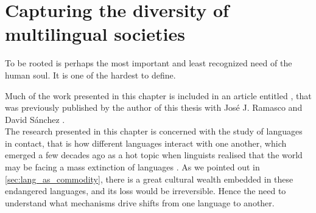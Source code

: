 \documentclass[../thesis.tex]{subfiles}
\begin{document}
\chapter{Capturing the diversity of multilingual societies}
\label{ch:multiling}

\epigraph{
  To be rooted is perhaps the most important and least recognized need of the
  human soul. It is one of the hardest to define.
}{
}

Much of the work presented in this chapter is included in an article entitled
, that was previously published by the author of
this thesis with Jos\'{e} J. Ramasco and David S\'{a}nchez
\cite{LoufCapturingDiversity2021}.
\\

The research presented in this chapter is concerned with the study of languages in
contact, that is how different languages interact with one another, which emerged a few
decades ago as a hot topic when linguists realised that the world may be facing a mass
extinction of languages
\cite{KraussWorldLanguages1992,GrenobleEndangeredLanguages1998,CrystalLanguageDeath2000}.
As we pointed out in \cref{sec:lang_as_commodity}, there is a great cultural wealth
embedded in these endangered languages, and its loss would be irreversible. Hence the
need to understand what mechanisms drive shifts from one language to another.
\end{document}
